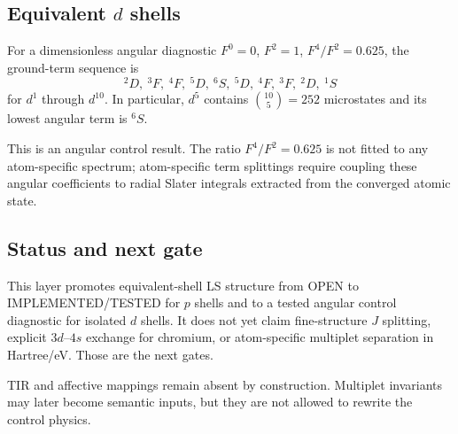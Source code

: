 \subsection{Equivalent $d$ shells}

For a dimensionless angular diagnostic $F^0=0$, $F^2=1$, $F^4/F^2=0.625$, the ground-term sequence is
\[
{}^2D,\ {}^3F,\ {}^4F,\ {}^5D,\ {}^6S,\ {}^5D,\ {}^4F,\ {}^3F,\ {}^2D,\ {}^1S
\]
for $d^1$ through $d^{10}$.  In particular, $d^5$ contains $\binom{10}{5}=252$ microstates and its lowest angular term is $^6S$.

This is an angular control result.  The ratio $F^4/F^2=0.625$ is not fitted to any atom-specific spectrum; atom-specific term splittings require coupling these angular coefficients to radial Slater integrals extracted from the converged atomic state.

\subsection{Status and next gate}

This layer promotes equivalent-shell LS structure from OPEN to IMPLEMENTED/TESTED for $p$ shells and to a tested angular control diagnostic for isolated $d$ shells.  It does not yet claim fine-structure $J$ splitting, explicit $3d$--$4s$ exchange for chromium, or atom-specific multiplet separation in Hartree/eV.  Those are the next gates.

TIR and affective mappings remain absent by construction.  Multiplet invariants may later become semantic inputs, but they are not allowed to rewrite the control physics.
